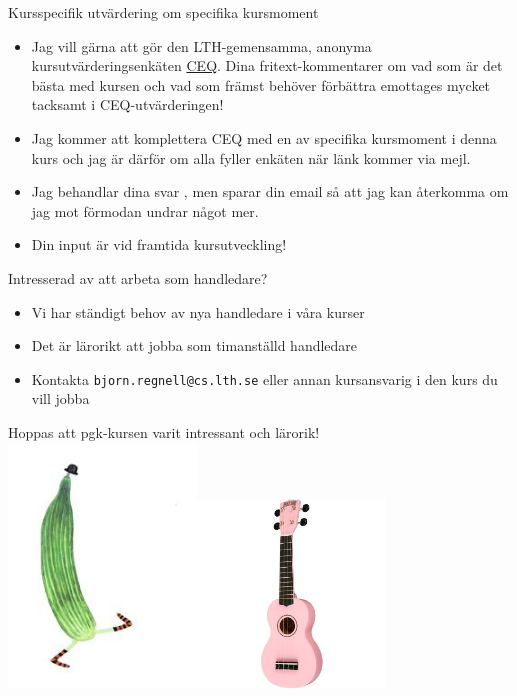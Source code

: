 \begin{Slide}{Kursspecifik utvärdering om specifika kursmoment}\SlideFontSmall
\begin{itemize}
\item Jag vill gärna att  gör den LTH-gemensamma, anonyma kursutvärderingsenkäten \href{https://www.ceq.lth.se/}{CEQ}. Dina fritext-kommentarer om vad som är det bästa med kursen och vad som främst behöver förbättra emottages mycket tacksamt i CEQ-utvärderingen!
\item Jag kommer att komplettera CEQ med en  av specifika kursmoment i denna kurs och jag är därför  om alla fyller enkäten när länk kommer via mejl.
\item Jag behandlar dina svar , men sparar din email så att jag kan återkomma om jag mot förmodan undrar något mer.
\item Din input är  vid framtida kursutveckling!
\end{itemize}
\end{Slide}

\begin{Slide}{Intresserad av att arbeta som handledare?}
\begin{itemize}
\item Vi har ständigt behov av nya handledare i våra kurser
\item Det är lärorikt att jobba som timanställd handledare
\item Kontakta \verb|bjorn.regnell@cs.lth.se| eller annan kursansvarig i den kurs du vill jobba
\end{itemize}
\end{Slide}

\begin{Slide}{Hoppas att pgk-kursen varit intressant och lärorik!}
\pause\includegraphics[width=5cm]{../img/gurka.jpg}\includegraphics[width=5cm]{../img/ukulele.jpg}
\end{Slide}

